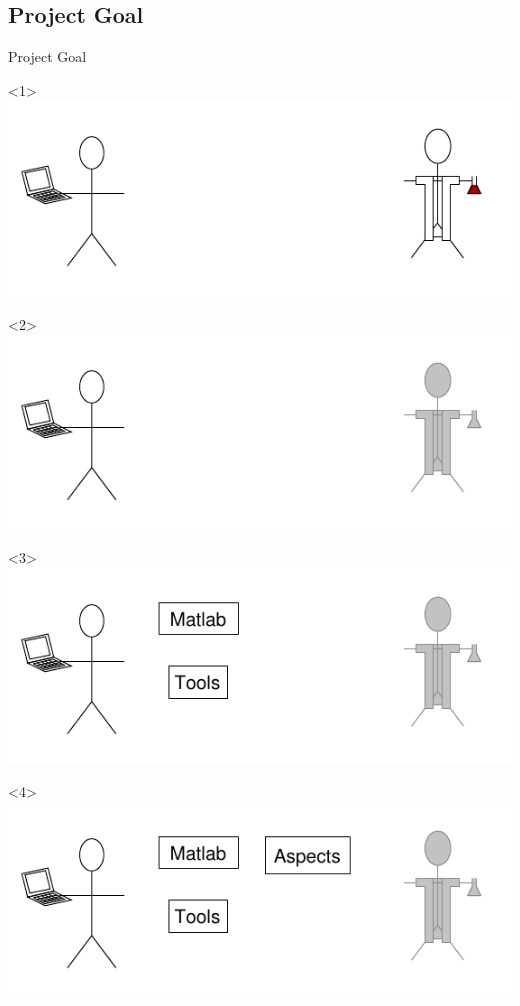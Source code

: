 \subsection{Project Goal}
\begin{frame}{Project Goal}
    \begin{onlyenv}<1>
      \includegraphics{images/perspectives1.pdf}
    \end{onlyenv}
    \begin{onlyenv}<2>
      \includegraphics{images/perspectives2_comp.pdf}
    \end{onlyenv}
    \begin{onlyenv}<3>
      \includegraphics{images/perspectives3_comp.pdf}
    \end{onlyenv}
    \begin{onlyenv}<4>
      \includegraphics{images/perspectives4_comp.pdf}

\end{onlyenv}
\end{frame}
